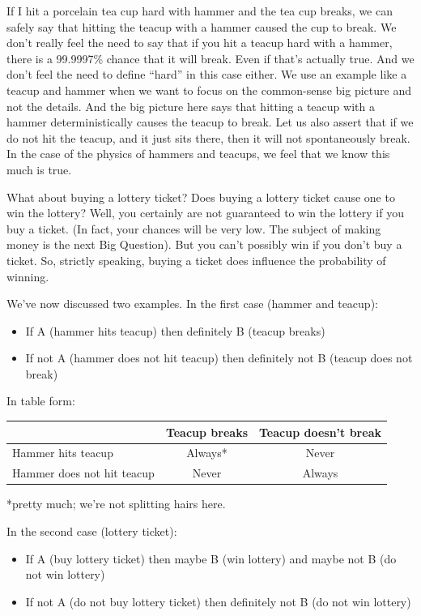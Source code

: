 \documentclass[
  openany]{book}
\providecommand{\tightlist}{%
  \setlength{\itemsep}{0pt}\setlength{\parskip}{0pt}}
\begin{document}
If I hit a porcelain tea cup hard with hammer and the tea cup breaks, we can safely say that hitting the teacup with a hammer caused the cup to break. We don't really feel the need to say that if you hit a teacup hard with a hammer, there is a 99.9997\% chance that it will break. Even if that's actually true. And we don't feel the need to define ``hard'' in this case either. We use an example like a teacup and hammer when we want to focus on the common-sense big picture and not the details. And the big picture here says that hitting a teacup with a hammer deterministically causes the teacup to break. Let us also assert that if we do not hit the teacup, and it just sits there, then it will not spontaneously break. In the case of the physics of hammers and teacups, we feel that we know this much is true.

What about buying a lottery ticket? Does buying a lottery ticket cause one to win the lottery? Well, you certainly are not guaranteed to win the lottery if you buy a ticket. (In fact, your chances will be very low. The subject of making money is the next Big Question). But you can't possibly win if you don't buy a ticket. So, strictly speaking, buying a ticket does influence the probability of winning.

We've now discussed two examples. In the first case (hammer and teacup):

\begin{itemize}
\tightlist
\item
  If A (hammer hits teacup) then definitely B (teacup breaks)
\item
  If not A (hammer does not hit teacup) then definitely not B (teacup does not break)
\end{itemize}

In table form:

\begin{longtable}[]{@{}lcc@{}}
\toprule
& Teacup breaks & Teacup doesn't break \\
\midrule
\endhead
Hammer hits teacup & Always* & Never \\
Hammer does not hit teacup & Never & Always \\
\bottomrule
\end{longtable}

*pretty much; we're not splitting hairs here.

In the second case (lottery ticket):

\begin{itemize}
\tightlist
\item
  If A (buy lottery ticket) then maybe B (win lottery) and maybe not B (do not win lottery)
\item
  If not A (do not buy lottery ticket) then definitely not B (do not win lottery)
\end{itemize}
\end{document}
